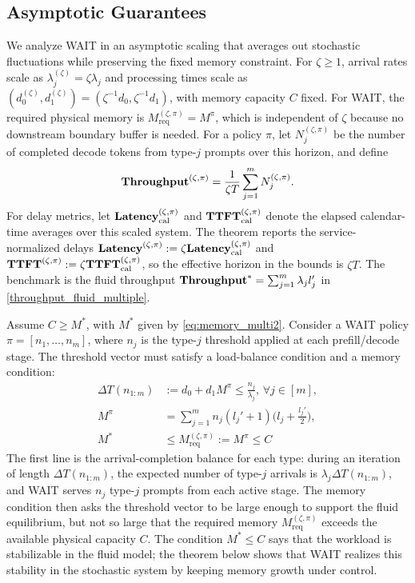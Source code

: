 \subsection{Asymptotic Guarantees}
\label{subsec:asymptotic_analysis}
\label{subsec:main_theorem}
We analyze WAIT in an asymptotic scaling that averages out stochastic fluctuations while preserving the fixed memory constraint. For \(\zeta\ge 1\), arrival rates scale as \(\lambda_j^{(\zeta)}=\zeta\lambda_j\) and processing times scale as \((d_0^{(\zeta)},d_1^{(\zeta)})=(\zeta^{-1}d_0,\zeta^{-1}d_1)\), with memory capacity \(C\) fixed. For WAIT, the required physical memory is \(M_{\mathrm{req}}^{(\zeta,\pi)}=M^\pi\), which is independent of \(\zeta\) because no downstream boundary buffer is needed. For a policy \(\pi\), let \(N_j^{(\zeta,\pi)}\) be the number of completed decode tokens from type-\(j\) prompts over this horizon, and define
\[
\textbf{Throughput}^{(\zeta, \pi)} = \frac{1}{\zeta T} \sum_{j=1}^m N_j^{(\zeta, \pi)}.
\]
For delay metrics, let \(\textbf{Latency}_{\rm cal}^{(\zeta,\pi)}\) and \(\textbf{TTFT}_{\rm cal}^{(\zeta,\pi)}\) denote the elapsed calendar-time averages over this scaled system. The theorem reports the service-normalized delays \(\textbf{Latency}^{(\zeta,\pi)}:=\zeta\textbf{Latency}_{\rm cal}^{(\zeta,\pi)}\) and \(\textbf{TTFT}^{(\zeta,\pi)}:=\zeta\textbf{TTFT}_{\rm cal}^{(\zeta,\pi)}\), so the effective horizon in the bounds is \(\zeta T\). The benchmark is the fluid throughput \(\textbf{Throughput}^*=\sum_{j=1}^m \lambda_j l_j'\) in \eqref{throughput_fluid_multiple}.

Assume \(C \ge M^*\), with \(M^*\) given by \eqref{eq:memory_multi2}. Consider a WAIT policy \(\pi=[n_1,\dots,n_m]\), where \(n_j\) is the type-\(j\) threshold applied at each prefill/decode stage. The threshold vector must satisfy a load-balance condition and a memory condition:
\begin{equation}
\label{eq:wait_thresholds}
\begin{aligned}
\Delta T(n_{1:m}) &:= d_0 + d_1 M^{\pi} \leq \tfrac{n_j}{\lambda_j},\, \forall j\in[m],\\
 M^{\pi} &= \sum_{j=1}^m n_j (l_j' + 1) \big(l_j + \tfrac{l_j'}{2}\big),\\
 M^* &\leq M_{\mathrm{req}}^{(\zeta,\pi)}:=M^\pi \leq C
\end{aligned}
\end{equation}
The first line is the arrival-completion balance for each type: during an iteration of length \(\Delta T(n_{1:m})\), the expected number of type-\(j\) arrivals is \(\lambda_j\Delta T(n_{1:m})\), and WAIT serves \(n_j\) type-\(j\) prompts from each active stage. The memory condition then asks the threshold vector to be large enough to support the fluid equilibrium, but not so large that the required memory \(M_{\mathrm{req}}^{(\zeta,\pi)}\) exceeds the available physical capacity \(C\). The condition \(M^*\le C\) says that the workload is stabilizable in the fluid model; the theorem below shows that WAIT realizes this stability in the stochastic system by keeping memory growth under control.

